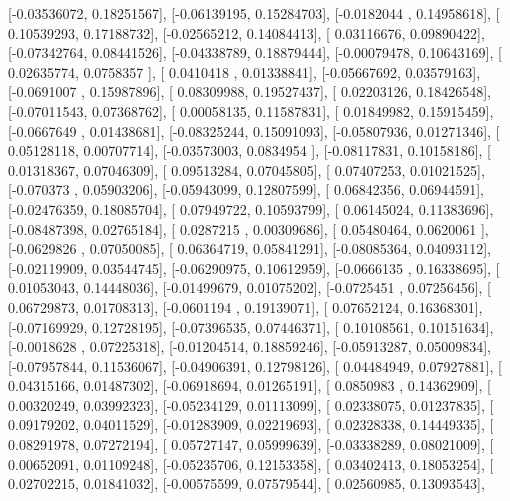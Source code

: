 \documentclass{article}
\begin{document}
       [-0.03536072,  0.18251567],
       [-0.06139195,  0.15284703],
       [-0.0182044 ,  0.14958618],
       [ 0.10539293,  0.17188732],
       [-0.02565212,  0.14084413],
       [ 0.03116676,  0.09890422],
       [-0.07342764,  0.08441526],
       [-0.04338789,  0.18879444],
       [-0.00079478,  0.10643169],
       [ 0.02635774,  0.0758357 ],
       [ 0.0410418 ,  0.01338841],
       [-0.05667692,  0.03579163],
       [-0.0691007 ,  0.15987896],
       [ 0.08309988,  0.19527437],
       [ 0.02203126,  0.18426548],
       [-0.07011543,  0.07368762],
       [ 0.00058135,  0.11587831],
       [ 0.01849982,  0.15915459],
       [-0.0667649 ,  0.01438681],
       [-0.08325244,  0.15091093],
       [-0.05807936,  0.01271346],
       [ 0.05128118,  0.00707714],
       [-0.03573003,  0.0834954 ],
       [-0.08117831,  0.10158186],
       [ 0.01318367,  0.07046309],
       [ 0.09513284,  0.07045805],
       [ 0.07407253,  0.01021525],
       [-0.070373  ,  0.05903206],
       [-0.05943099,  0.12807599],
       [ 0.06842356,  0.06944591],
       [-0.02476359,  0.18085704],
       [ 0.07949722,  0.10593799],
       [ 0.06145024,  0.11383696],
       [-0.08487398,  0.02765184],
       [ 0.0287215 ,  0.00309686],
       [ 0.05480464,  0.0620061 ],
       [-0.0629826 ,  0.07050085],
       [ 0.06364719,  0.05841291],
       [-0.08085364,  0.04093112],
       [-0.02119909,  0.03544745],
       [-0.06290975,  0.10612959],
       [-0.0666135 ,  0.16338695],
       [ 0.01053043,  0.14448036],
       [-0.01499679,  0.01075202],
       [-0.0725451 ,  0.07256456],
       [ 0.06729873,  0.01708313],
       [-0.0601194 ,  0.19139071],
       [ 0.07652124,  0.16368301],
       [-0.07169929,  0.12728195],
       [-0.07396535,  0.07446371],
       [ 0.10108561,  0.10151634],
       [-0.0018628 ,  0.07225318],
       [-0.01204514,  0.18859246],
       [-0.05913287,  0.05009834],
       [-0.07957844,  0.11536067],
       [-0.04906391,  0.12798126],
       [ 0.04484949,  0.07927881],
       [ 0.04315166,  0.01487302],
       [-0.06918694,  0.01265191],
       [ 0.0850983 ,  0.14362909],
       [ 0.00320249,  0.03992323],
       [-0.05234129,  0.01113099],
       [ 0.02338075,  0.01237835],
       [ 0.09179202,  0.04011529],
       [-0.01283909,  0.02219693],
       [ 0.02328338,  0.14449335],
       [ 0.08291978,  0.07272194],
       [ 0.05727147,  0.05999639],
       [-0.03338289,  0.08021009],
       [ 0.00652091,  0.01109248],
       [-0.05235706,  0.12153358],
       [ 0.03402413,  0.18053254],
       [ 0.02702215,  0.01841032],
       [-0.00575599,  0.07579544],
       [ 0.02560985,  0.13093543],
\end{document}
